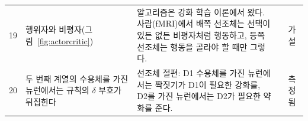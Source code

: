 {\begin{longtable}{>{\raggedright}p{0.5cm}>{\raggedright}p{4.0cm}>{\raggedright}p{5.6cm}>{\raggedright}p{2.3cm}>{\raggedright\arraybackslash}p{1.7cm}}
19 & 행위자와 비평자(그림~\ref{fig:actorcritic}) & 알고리즘은 강화 학습 이론에서 왔다. 사람(fMRI)에서 배쪽 선조체는 선택이 있든 없든 비평자처럼 행동하고, 등쪽 선조체는 행동을 골라야 할 때만 그렇다. & \cite{SuttonBarto2018, ODoherty2004actor} & 가설 \\
20 & 두 번째 계열의 수용체를 가진 뉴런에서는 규칙의 $\delta$ 부호가 뒤집힌다 & 선조체 절편: D1 수용체를 가진 뉴런에서는 짝짓기가 D1이 필요한 강화를, D2를 가진 뉴런에서는 D2가 필요한 약화를 준다. & \cite{Shen2008} & 측정됨 \\
\bottomrule
\end{longtable}}
